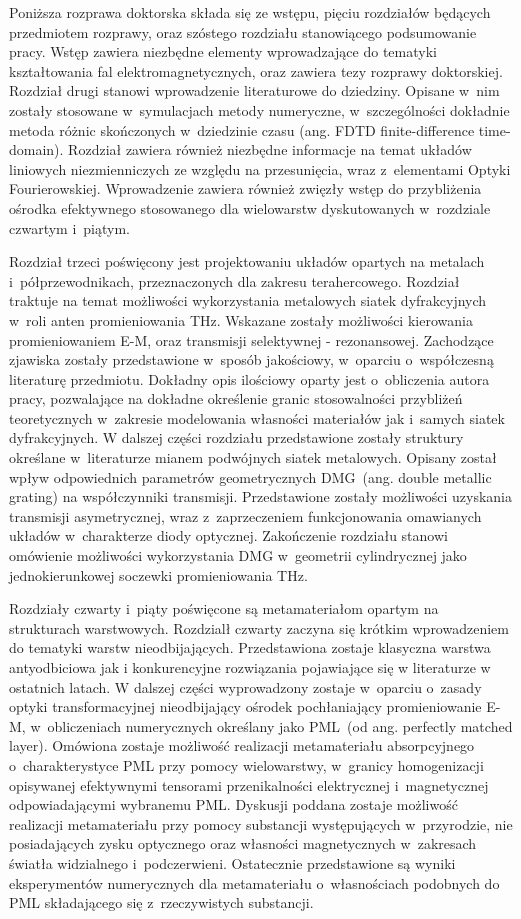Poniższa rozprawa doktorska składa się ze wstępu, pięciu rozdziałów  będących przedmiotem rozprawy, oraz szóstego rozdziału stanowiącego podsumowanie pracy. Wstęp zawiera niezbędne elementy wprowadzające do tematyki kształtowania fal elektromagnetycznych, oraz zawiera tezy rozprawy doktorskiej. Rozdział drugi stanowi wprowadzenie literaturowe do dziedziny. Opisane w~nim zostały stosowane w~symulacjach metody numeryczne, w~szczególności dokładnie metoda różnic skończonych w~dziedzinie czasu (ang. FDTD finite-difference time-domain). Rozdział zawiera również niezbędne informacje na temat układów liniowych niezmienniczych ze względu na przesunięcia, wraz z~elementami Optyki Fourierowskiej. Wprowadzenie zawiera również zwięzły wstęp do przybliżenia ośrodka efektywnego stosowanego dla wielowarstw dyskutowanych w~rozdziale czwartym i~piątym.

Rozdział trzeci poświęcony jest projektowaniu układów opartych na metalach i~półprzewodnikach, przeznaczonych dla zakresu terahercowego. Rozdział traktuje na temat możliwości wykorzystania metalowych siatek dyfrakcyjnych w~roli anten promieniowania THz. Wskazane zostały możliwości kierowania promieniowaniem E-M, oraz transmisji  selektywnej - rezonansowej. Zachodzące zjawiska zostały przedstawione w~sposób jakościowy, w~oparciu o~współczesną literaturę przedmiotu. Dokładny opis ilościowy oparty jest o~obliczenia autora pracy, pozwalające na dokładne określenie granic stosowalności przybliżeń teoretycznych w~zakresie modelowania własności materiałów jak i~samych siatek dyfrakcyjnych. W dalszej części rozdziału przedstawione zostały struktury określane w~literaturze mianem podwójnych siatek metalowych. Opisany został wpływ odpowiednich parametrów geometrycznych DMG~(ang. double metallic grating) na współczynniki transmisji. Przedstawione zostały możliwości uzyskania transmisji asymetrycznej, wraz z~zaprzeczeniem funkcjonowania omawianych układów w~charakterze diody optycznej. Zakończenie rozdziału stanowi omówienie możliwości wykorzystania DMG w~geometrii cylindrycznej jako jednokierunkowej soczewki promieniowania THz.

Rozdziały czwarty i~piąty poświęcone są metamateriałom opartym na strukturach warstwowych. Rozdzialł czwarty zaczyna się krótkim wprowadzeniem do tematyki warstw nieodbijających. Przedstawiona zostaje klasyczna warstwa antyodbiciowa jak i konkurencyjne rozwiązania pojawiające się w literaturze w ostatnich latach. W dalszej części wyprowadzony zostaje w~oparciu o~zasady optyki transformacyjnej nieodbijający ośrodek pochłaniający promieniowanie E-M, w~obliczeniach numerycznych określany jako PML~(od ang. perfectly matched layer). Omówiona zostaje możliwość realizacji metamateriału absorpcyjnego o~charakterystyce PML przy pomocy wielowarstwy, w~granicy homogenizacji opisywanej efektywnymi tensorami przenikalności elektrycznej i~magnetycznej odpowiadającymi wybranemu PML. Dyskusji poddana zostaje możliwość realizacji metamateriału przy pomocy substancji występujących w~przyrodzie, nie posiadających zysku optycznego oraz własności magnetycznych w~zakresach światła widzialnego i~podczerwieni. Ostatecznie przedstawione są wyniki eksperymentów numerycznych dla metamateriału o~własnościach podobnych do PML składającego się z~rzeczywistych substancji.

